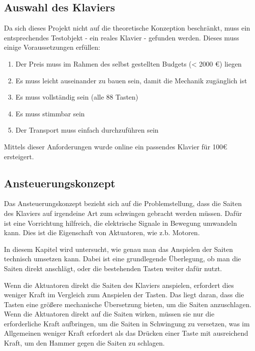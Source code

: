 \subsection{Auswahl des Klaviers}


Da sich dieses Projekt nicht auf die theoretische Konzeption beschränkt, muss ein entsprechendes Testobjekt - ein reales Klavier - gefunden werden.
Dieses muss einige Voraussetzungen erfüllen:
\begin{enumerate}
	\item 	Der Preis muss im Rahmen des selbst gestellten Budgets (< 2000 €) liegen
	\item 	Es muss leicht auseinander zu bauen sein, damit die Mechanik zugänglich ist
	\item 	Es muss vollständig sein (alle 88 Tasten)
	\item 	Es muss stimmbar sein
	\item 	Der Transport muss einfach durchzuführen sein
\end{enumerate}

Mittels dieser Anforderungen wurde online ein passendes Klavier für 100€ ersteigert.

\subsection{Ansteuerungskonzept} \label{subsec:konzeptionhw-ansteuerungskonzept}


Das Ansteuerungskonzept bezieht sich auf die Problemstellung, dass die Saiten des Klaviers auf irgendeine Art zum
schwingen gebracht werden müssen.
Dafür ist eine Vorrichtung hilfreich, die elektrische Signale in Bewegung umwandeln kann.
Dies ist die Eigenschaft von Aktuatoren, wie z.b. Motoren.

In diesem Kapitel wird untersucht, wie genau man das Anspielen der Saiten technisch umsetzen kann.
Dabei ist eine grundlegende Überlegung, ob man die Saiten direkt anschlägt,
oder die bestehenden Tasten weiter dafür nutzt.

Wenn die Aktuatoren direkt die Saiten des Klaviers anspielen, erfordert dies weniger Kraft im Vergleich zum
Anspielen der Tasten. Das liegt daran, dass die Tasten eine größere mechanische Übersetzung bieten, um die Saiten
anzuschlagen. Wenn die Aktuatoren direkt auf die Saiten wirken, müssen sie nur die erforderliche Kraft aufbringen, um
die Saiten in Schwingung zu versetzen, was im Allgemeinen weniger Kraft erfordert als das Drücken einer Taste mit
ausreichend Kraft, um den Hammer gegen die Saiten zu schlagen.


